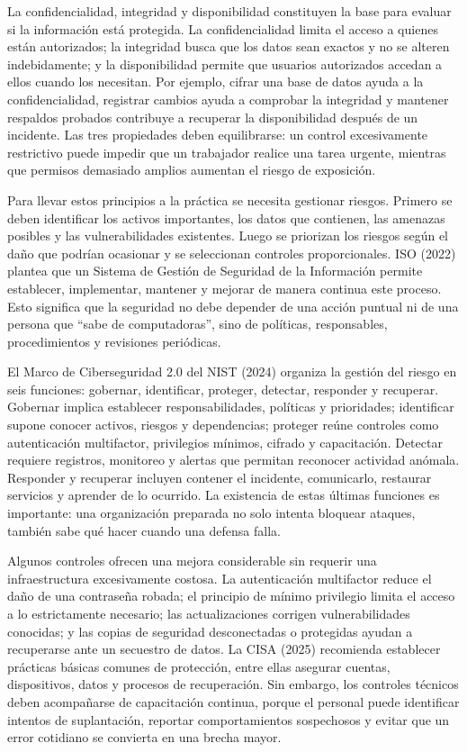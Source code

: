 \documentclass[12pt,letterpaper]{article}
\begin{document}
La confidencialidad, integridad y disponibilidad constituyen la base para evaluar si la información está protegida. La confidencialidad limita el acceso a quienes están autorizados; la integridad busca que los datos sean exactos y no se alteren indebidamente; y la disponibilidad permite que usuarios autorizados accedan a ellos cuando los necesitan. Por ejemplo, cifrar una base de datos ayuda a la confidencialidad, registrar cambios ayuda a comprobar la integridad y mantener respaldos probados contribuye a recuperar la disponibilidad después de un incidente. Las tres propiedades deben equilibrarse: un control excesivamente restrictivo puede impedir que un trabajador realice una tarea urgente, mientras que permisos demasiado amplios aumentan el riesgo de exposición.

Para llevar estos principios a la práctica se necesita gestionar riesgos. Primero se deben identificar los activos importantes, los datos que contienen, las amenazas posibles y las vulnerabilidades existentes. Luego se priorizan los riesgos según el daño que podrían ocasionar y se seleccionan controles proporcionales. ISO (2022) plantea que un Sistema de Gestión de Seguridad de la Información permite establecer, implementar, mantener y mejorar de manera continua este proceso. Esto significa que la seguridad no debe depender de una acción puntual ni de una persona que ``sabe de computadoras'', sino de políticas, responsables, procedimientos y revisiones periódicas.

El Marco de Ciberseguridad 2.0 del NIST (2024) organiza la gestión del riesgo en seis funciones: gobernar, identificar, proteger, detectar, responder y recuperar. Gobernar implica establecer responsabilidades, políticas y prioridades; identificar supone conocer activos, riesgos y dependencias; proteger reúne controles como autenticación multifactor, privilegios mínimos, cifrado y capacitación. Detectar requiere registros, monitoreo y alertas que permitan reconocer actividad anómala. Responder y recuperar incluyen contener el incidente, comunicarlo, restaurar servicios y aprender de lo ocurrido. La existencia de estas últimas funciones es importante: una organización preparada no solo intenta bloquear ataques, también sabe qué hacer cuando una defensa falla.

Algunos controles ofrecen una mejora considerable sin requerir una infraestructura excesivamente costosa. La autenticación multifactor reduce el daño de una contraseña robada; el principio de mínimo privilegio limita el acceso a lo estrictamente necesario; las actualizaciones corrigen vulnerabilidades conocidas; y las copias de seguridad desconectadas o protegidas ayudan a recuperarse ante un secuestro de datos. La CISA (2025) recomienda establecer prácticas básicas comunes de protección, entre ellas asegurar cuentas, dispositivos, datos y procesos de recuperación. Sin embargo, los controles técnicos deben acompañarse de capacitación continua, porque el personal puede identificar intentos de suplantación, reportar comportamientos sospechosos y evitar que un error cotidiano se convierta en una brecha mayor.
\end{document}
